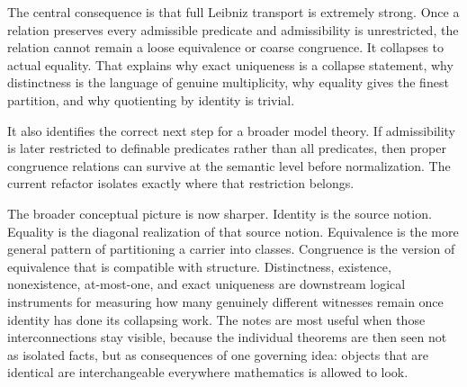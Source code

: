 \documentclass[11pt]{article}
\begin{document}
The central consequence is that full Leibniz transport is extremely strong. Once a relation preserves every admissible predicate and admissibility is unrestricted, the relation cannot remain a loose equivalence or coarse congruence. It collapses to actual equality. That explains why exact uniqueness is a collapse statement, why distinctness is the language of genuine multiplicity, why equality gives the finest partition, and why quotienting by identity is trivial.

It also identifies the correct next step for a broader model theory. If admissibility is later restricted to definable predicates rather than all predicates, then proper congruence relations can survive at the semantic level before normalization. The current refactor isolates exactly where that restriction belongs.

The broader conceptual picture is now sharper. Identity is the source notion. Equality is the diagonal realization of that source notion. Equivalence is the more general pattern of partitioning a carrier into classes. Congruence is the version of equivalence that is compatible with structure. Distinctness, existence, nonexistence, at-most-one, and exact uniqueness are downstream logical instruments for measuring how many genuinely different witnesses remain once identity has done its collapsing work. The notes are most useful when those interconnections stay visible, because the individual theorems are then seen not as isolated facts, but as consequences of one governing idea: objects that are identical are interchangeable everywhere mathematics is allowed to look.
\end{document}
